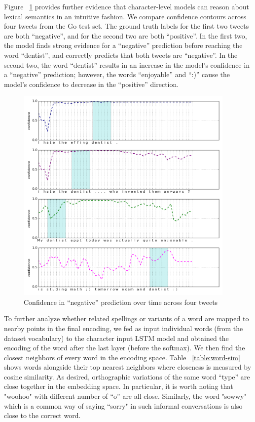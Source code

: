 \documentclass{article} %
\begin{document}
Figure ~\ref{fig:dentist} provides further evidence that character-level models can reason about lexical semantics in an intuitive fashion. We compare confidence contours across four tweets from the Go test set. The ground truth labels for the first two tweets are both ``negative'', and for the second two are both ``positive''. In the first two, the model finds strong evidence for a ``negative'' prediction before reaching the word ``dentist'', and correctly predicts that both tweets are ``negative''. In the second two, the word ``dentist'' results in an increase in the model's confidence in a ``negative'' prediction; however, the words ``enjoyable'' and ``:)'' cause the model's confidence to decrease in the ``positive'' direction. 

\begin{figure}[h!]

\begin{center}
\includegraphics[width=0.95\textwidth]{figs/dentist}
\end{center}
\caption{Confidence in ``negative'' prediction over time across four tweets}
\label{fig:dentist}
\end{figure}

To further analyze whether related spellings or variants of a word are mapped to nearby points in the final encoding, we fed as input individual words (from the dataset vocabulary) to the character input LSTM model and obtained the encoding of the word after the last layer (before the softmax).
We then find the closest neighbors of every word in the encoding space.
Table ~\ref{table:word-sim} shows words alongside their top nearest neighbors where closeness is measured by cosine similarity. As desired, orthographic variations of the same word ``type'' are close together in the embedding space. In particular, it is worth noting that "woohoo" with different number of ``o'' are all close. Similarly, the word "sowwy" which is a common way of saying ``sorry" in such informal conversations is also close to the correct word.
\end{document}
